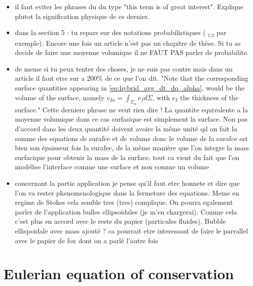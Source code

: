 \documentclass[12pt]{My_preprint}
\newcommand{\tb}[1]{\color{blue}#1\color{black}}
\renewcommand{\ref}[1]{\autoref{#1}}
\begin{document}
{\begin{itemize}
\tb{le quel ? regarder Prosperetti}
\item il faut eviter les phrases du du type "this term is of great interest". Explique plutot la signification physique de ce dernier.
\item dans la section 5 : tu repars sur des notations probabilistiques ( $_{1|2}$ par exemple). Encore une fois un article n'est pas un chapitre de thèse. Si tu as decide de faire une moyenne volumique il ne FAUT PAS parler de probabilite.
\item de meme si tu peux tenter des choses, je ne suis pas contre mais dans un article il faut etre sur a 200\% de ce que l'on dit. "Note that the corresponding surface quantities appearing in \ref{eq:hybrid_avg_dt_dq_alpha}, would be the volume of the surface, namely $v_{I\alpha} = \int_{\Sigma_\alpha} e_I d\Sigma$, with $e_I$ the thickness of the surface." Cette derniere phrase ne veut rien dire ! La quantite equivalente a la moyenne volumique dans ce cas surfasique est simplement la surface.
\tb{Non pas d'accord dans  les deux quantité doivent avoire la même unité qd on fait la somme des equations de surafce et de volume donc le volume de la surafce est bien son épaisseur fois la surafec, de la même manière que l'on integre la mass surfacique pour obtenir la mass de la surface. tout ca vient du fait que l'on modélise l'interface comme une surface et non comme un volume }
\item concernant la partie application je pense qu'il faut etre honnete et dire que l'on va rester phenomenologique dans la fermeture des equations. Meme en regime de Stokes cela semble tres (tres) complique. On pourra egalement parler de l'application bulles ellipsoidales (je m'en chargerai). Comme cela c'est plus en accord avec le reste du papier (particules fluides).
\tb{Bubble ellispoidale avec mass ajouté ? ca pourrait etre interessant de faire le parrallel avec le papier de fox dont on a parlé l'autre fois}
\end{itemize}


}
\section{Eulerian equation of conservation}
\label{sec:two-fluid}


\end{document}
